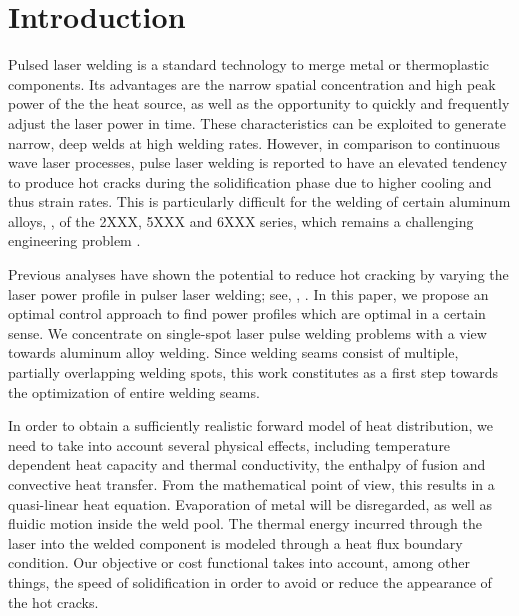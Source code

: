 
\section{Introduction}
\label{sec:introduction}

Pulsed laser welding is a standard technology to merge metal or thermoplastic components.
Its advantages are the narrow spatial concentration and high peak power of the the heat source, as well as the opportunity to quickly and frequently adjust the laser power in time.
These characteristics can be exploited to generate narrow, deep welds at high welding rates.
However, in comparison to continuous wave laser processes, pulse laser welding is reported to have an elevated tendency to produce hot cracks during the solidification phase due to higher cooling and thus strain rates.
This is particularly difficult for the welding of certain aluminum alloys, \eg, of the 2XXX, 5XXX and 6XXX series, which remains a challenging engineering problem \cite{Katayama:2001:1,ZhangWeckmanZhou:2008:1,BieleninBergmann:2017:1}.

Previous analyses have shown the potential to reduce hot cracking by varying the laser power profile in pulser laser welding; see, \eg, \cite{BieleninBergmann:2017:1,JiaZhangYuShiLiuWuYeWangTian:2021:1}.
In this paper, we propose an optimal control approach to find power profiles which are optimal in a certain sense.
We concentrate on single-spot laser pulse welding problems with a view towards aluminum alloy welding.
Since welding seams consist of multiple, partially overlapping welding spots, this work constitutes as a first step towards the optimization of entire welding seams.

In order to obtain a sufficiently realistic forward model of heat distribution, we need to take into account several physical effects, including temperature dependent heat capacity and thermal conductivity, the enthalpy of fusion and convective heat transfer.
From the mathematical point of view, this results in a quasi-linear heat equation.
Evaporation of metal will be disregarded, as well as fluidic motion inside the weld pool.
The thermal energy incurred through the laser into the welded component is modeled through a heat flux boundary condition.
Our objective or cost functional takes into account, among other things, the speed of solidification in order to avoid or reduce the appearance of the hot cracks.

